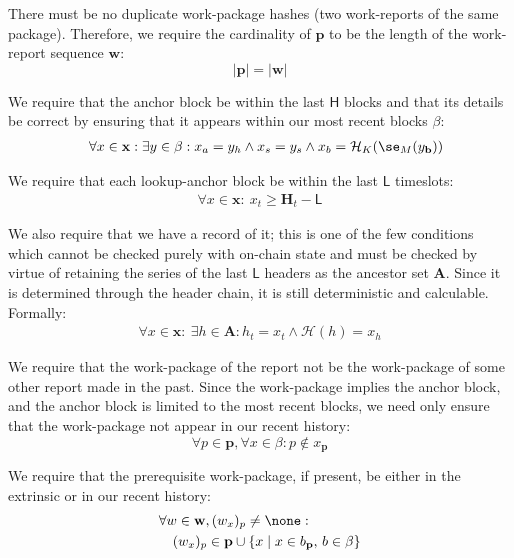 There must be no duplicate work-package hashes (\ie two work-reports of the same package). Therefore, we require the cardinality of $\mathbf{p}$ to be the length of the work-report sequence $\mathbf{w}$:
\begin{equation}
  |\mathbf{p}| = |\mathbf{w}|
\end{equation}

We require that the anchor block be within the last $\mathsf{H}$ blocks and that its details be correct by ensuring that it appears within our most recent blocks $\beta$:
\begin{align}
  \forall x \in \mathbf{x} : \exists y \in \beta : x_a = y_h \wedge x_s = y_s \wedge x_b = \mathcal{H}_K(\se_M(y_\mathbf{b}))\!\!\!\!\!\!
\end{align}

We require that each lookup-anchor block be within the last $\mathsf{L}$ timeslots:
\begin{align}
  \forall x \in \mathbf{x} :\ x_t \ge \mathbf{H}_t - \mathsf{L}
\end{align}

We also require that we have a record of it; this is one of the few conditions which cannot be checked purely with on-chain state and must be checked by virtue of retaining the series of the last $\mathsf{L}$ headers as the ancestor set $\mathbf{A}$. Since it is determined through the header chain, it is still deterministic and calculable. Formally:
\begin{align}
  \forall x \in \mathbf{x} :\ \exists h \in \mathbf{A}: h_t = x_t \wedge \mathcal{H}(h) = x_h
\end{align}

We require that the work-package of the report not be the work-package of some other report made in the past. Since the work-package implies the anchor block, and the anchor block is limited to the most recent blocks, we need only ensure that the work-package not appear in our recent history:
\begin{equation}
  \forall p \in \mathbf{p}, \forall x \in \beta : p \not\in x_\mathbf{p}
\end{equation}

We require that the prerequisite work-package, if present, be either in the extrinsic or in our recent history:
\begin{equation}\begin{aligned}
  &\forall w \in \mathbf{w}, (w_x)_p \ne \none :\\
  &\quad(w_x)_p \in \mathbf{p} \cup \{ x \mid x \in b_\mathbf{p} ,\, b \in \beta \}
\end{aligned}\end{equation}

